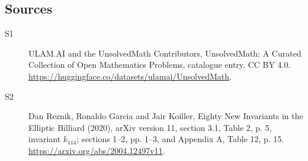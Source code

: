 \documentclass[11pt]{article}
\begin{document}
\subsection{Sources}
\begin{description}
\item[\hypertarget{source:statement:1}{S1}] ULAM.AI and the UnsolvedMath Contributors, UnsolvedMath: A Curated Collection of Open Mathematics Problems, catalogue entry. CC BY 4.0. \url{https://huggingface.co/datasets/ulamai/UnsolvedMath}.
\item[\hypertarget{source:statement:2}{S2}] Dan Reznik, Ronaldo Garcia and Jair Koiller, Eighty New Invariants in the Elliptic Billiard (2020), arXiv version 11, section 3.1, Table 2, p. 5, invariant $k_{114}$; sections 1--2, pp. 1--3, and Appendix A, Table 12, p. 15. \url{https://arxiv.org/abs/2004.12497v11}.
\end{description}
\label{end:statement}
\end{document}
